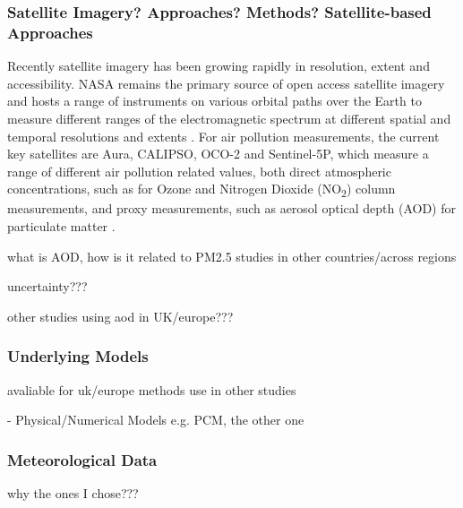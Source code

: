 \subsubsection{Satellite \textbf{Imagery? Approaches? Methods? Satellite-based Approaches}}
Recently satellite imagery has been growing rapidly in resolution, extent and accessibility. NASA remains the primary source of open access satellite imagery and hosts a range of instruments on various orbital paths over the Earth to measure different ranges of the electromagnetic spectrum at different spatial and temporal resolutions and extents \citep{NASA2021SVS:2021}. For air pollution measurements, the current key satellites are Aura, CALIPSO, OCO-2 and Sentinel-5P, which measure a range of different air pollution related values, both direct atmospheric concentrations, such as for Ozone and Nitrogen Dioxide (NO\textsubscript{2}) column measurements, and proxy measurements, such as aerosol optical depth (AOD) for particulate matter \citep{Gray2021MeetExpeditions}. 

what is AOD, how is it related to PM2.5
studies in other countries/across regions

uncertainty???

other studies using aod in UK/europe???

\subsubsection{Underlying Models}
avaliable for uk/europe
methods
use in other studies

 - Physical/Numerical Models e.g. PCM, the other one\\

\subsubsection{Meteorological Data} \label{Section:Met Data}
why the ones I chose???


    
